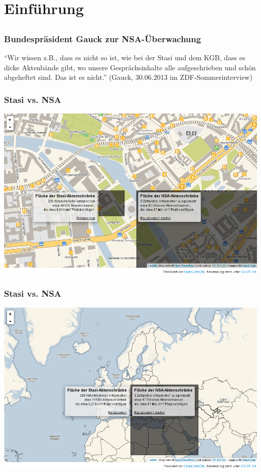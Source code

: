 \documentclass[12pt]{beamer}
\begin{document}
\section{Einführung}
\subsection{}

\begin{frame}
    \frametitle{Bundespräsident Gauck zur NSA-Überwachung}
    \begin{center}
      ``Wir wissen z.B., dass es nicht so ist, wie bei der Stasi und dem KGB, dass es dicke Aktenbände gibt, wo unsere Gesprächsinhalte alle aufgeschrieben und schön abgeheftet sind. Das ist es nicht.''
      (Gauck, 30.06.2013 im ZDF-Sommerinterview)
    \end{center}
\end{frame}

\begin{frame}
    \frametitle{Stasi vs. NSA}
    \begin{center}
      \includegraphics[height=0.7\textheight]{img/akten1.png}
    \end{center}
\end{frame}

\begin{frame}
    \frametitle{Stasi vs. NSA}
    \begin{center}
      \includegraphics[height=0.7\textheight]{img/akten2.png}
    \end{center}
\end{frame}
\end{document}
